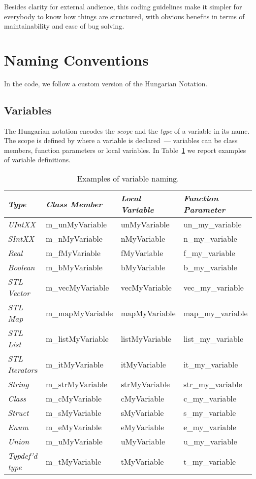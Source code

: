 \documentclass[a4paper]{article}
\begin{document}
Besides clarity for external audience, this coding guidelines make it
simpler for everybody to know how things are structured, with obvious
benefits in terms of maintainability and ease of bug solving.

\section{Naming Conventions}
\label{sec:naming_conventions}
In the code, we follow a custom version of the Hungarian Notation.

\subsection{Variables}
\label{subsec:variables}
The Hungarian notation encodes the {\it scope} and the {\it type} of a
variable in its name. The scope is defined by where a variable is
declared~--- variables can be class members, function parameters or
local variables. In Table~\ref{table:var_naming} we report examples of
variable definitions.
%
\begin{table}[b]
  \caption{Examples of variable naming.}
  \label{table:var_naming}
  \centering
  \begin{footnotesize}
    \begin{tabular}{l l l l}
      \toprule
      {\it Type} & {\it Class Member} & {\it Local Variable} & {\it Function Parameter} \\
      \midrule
      {\it UIntXX} & m\_unMyVariable & unMyVariable & un\_my\_variable \\
      {\it SIntXX} & m\_nMyVariable & nMyVariable & n\_my\_variable \\
      {\it Real} & m\_fMyVariable & fMyVariable & f\_my\_variable \\
      {\it Boolean} & m\_bMyVariable & bMyVariable & b\_my\_variable \\
      {\it STL Vector} & m\_vecMyVariable & vecMyVariable & vec\_my\_variable \\
      {\it STL Map} & m\_mapMyVariable & mapMyVariable & map\_my\_variable \\
      {\it STL List} & m\_listMyVariable & listMyVariable & list\_my\_variable \\
      {\it STL Iterators} & m\_itMyVariable & itMyVariable & it\_my\_variable \\
      {\it String} & m\_strMyVariable & strMyVariable & str\_my\_variable \\
      {\it Class} & m\_cMyVariable & cMyVariable & c\_my\_variable \\
      {\it Struct} & m\_sMyVariable & sMyVariable & s\_my\_variable \\
      {\it Enum} & m\_eMyVariable & eMyVariable & e\_my\_variable \\
      {\it Union} & m\_uMyVariable & uMyVariable & u\_my\_variable \\
      {\it Typdef'd type} & m\_tMyVariable & tMyVariable & t\_my\_variable \\
      \bottomrule
    \end{tabular}
  \end{footnotesize}
\end{table}
\end{document}
